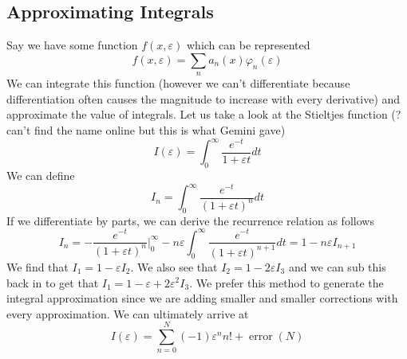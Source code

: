 \documentclass{article}
\begin{document}
\subsection{Approximating Integrals}
Say we have some function $f(x,\varepsilon)$ which can be represented 
\begin{equation*}
    f(x,\varepsilon)=\sum_n a_n(x)\varphi_n(\varepsilon)
\end{equation*}
We can integrate this function (however we can't differentiate because differentiation often causes the magnitude to increase with every derivative) and approximate the value of integrals. Let us take a look at the Stieltjes function (? can't find the name online but this is what Gemini gave) 
\begin{equation*}
    I(\varepsilon)=\int^\infty_0\frac{e^{-t}}{1+\varepsilon t} dt
\end{equation*}
We can define 
\begin{equation*}
    I_n=\int^\infty_0\frac{e^{-t}}{(1+\varepsilon t)^n}dt
\end{equation*}
If we differentiate by parts, we can derive the recurrence relation as follows 
\begin{equation*}
    I_n = -\frac{e^{-t}}{(1+\varepsilon t)^n}\Bigg|^\infty_0 -n\varepsilon\int^\infty_0\frac{e^{-t}}{(1+\varepsilon t)^{n+1}}dt = 1-n\varepsilon I_{n+1}
\end{equation*}
We find that $I_1=1-\varepsilon I_2$. We also see that $I_2=1-2\varepsilon I_3$ and we can sub this back in to get that $I_1=1-\varepsilon+2\varepsilon^2 I_3$. We prefer this method to generate the integral approximation since we are adding smaller and smaller corrections with every approximation. We can ultimately arrive at 
\begin{equation*}
    I(\varepsilon)=\sum^N_{n=0}(-1)\varepsilon^n n! +\operatorname{error}(N)
\end{equation*}
\end{document}
